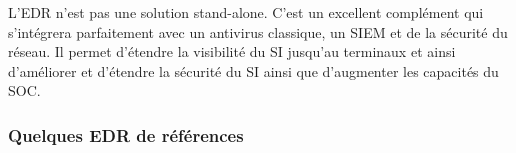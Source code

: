 L’EDR n’est pas une solution stand-alone. C’est un excellent complément qui s’intégrera parfaitement avec un antivirus classique, un SIEM et de la sécurité du réseau. Il permet d’étendre la visibilité du SI jusqu’au terminaux et ainsi d’améliorer et d’étendre la sécurité du SI ainsi que d’augmenter les capacités du SOC.

\subsubsection{Quelques EDR de références}

